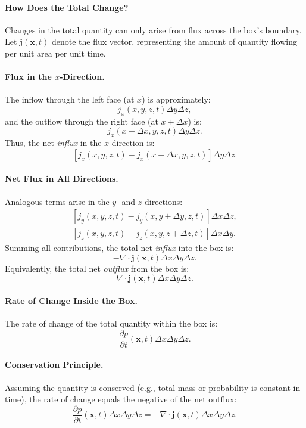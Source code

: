 \paragraph{How Does the Total Change?}
Changes in the total quantity can only arise from flux across the box’s boundary. Let $\mathbf{j}(\mathbf{x}, t)$ denote the flux vector, representing the amount of quantity flowing per unit area per unit time.

\paragraph{Flux in the $x$-Direction.}
The inflow through the left face (at $x$) is approximately:
\[
j_x(x, y, z, t) \Delta y \Delta z,
\]
and the outflow through the right face (at $x + \Delta x$) is:
\[
j_x(x + \Delta x, y, z, t) \Delta y \Delta z.
\]
Thus, the net \emph{influx} in the $x$-direction is:
\[
\left[ j_x(x, y, z, t) - j_x(x + \Delta x, y, z, t) \right] \Delta y \Delta z.
\]

\paragraph{Net Flux in All Directions.}
Analogous terms arise in the $y$- and $z$-directions:
\begin{align*}
\left[ j_y(x, y, z, t) - j_y(x, y + \Delta y, z, t) \right] \Delta x \Delta z, \\
\left[ j_z(x, y, z, t) - j_z(x, y, z + \Delta z, t) \right] \Delta x \Delta y.
\end{align*}
Summing all contributions, the total net \emph{influx} into the box is:
\[
- \nabla \cdot \mathbf{j}(\mathbf{x}, t) \Delta x \Delta y \Delta z.
\]
Equivalently, the total net \emph{outflux} from the box is:
\[
\nabla \cdot \mathbf{j}(\mathbf{x}, t) \Delta x \Delta y \Delta z.
\]

\paragraph{Rate of Change Inside the Box.}
The rate of change of the total quantity within the box is:
\[
\frac{\partial p}{\partial t}(\mathbf{x}, t) \Delta x \Delta y \Delta z.
\]

\paragraph{Conservation Principle.}
Assuming the quantity is conserved (e.g., total mass or probability is constant in time), the rate of change equals the negative of the net outflux:
\[
\frac{\partial p}{\partial t}(\mathbf{x}, t) \Delta x \Delta y \Delta z = - \nabla \cdot \mathbf{j}(\mathbf{x}, t) \Delta x \Delta y \Delta z.
\]

